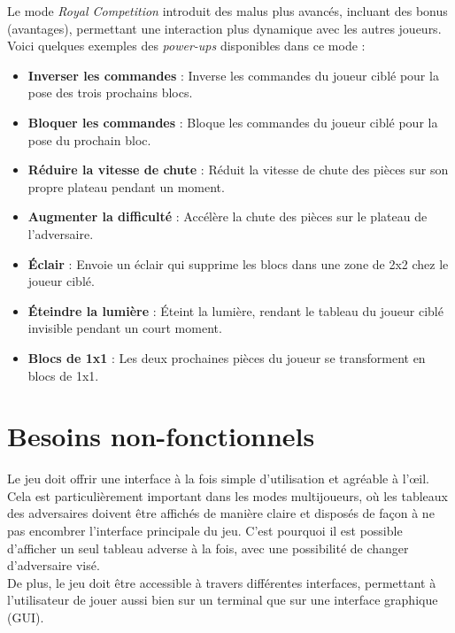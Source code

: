 \documentclass{report}
\begin{document}
\vspace{-1em}

\noindent Le mode \emph{Royal Competition} introduit des malus plus avancés, incluant des bonus (avantages), permettant une interaction plus dynamique avec les autres joueurs. Voici quelques exemples des \textit{power-ups} disponibles dans ce mode :
\begin{itemize}
    \item \textbf{Inverser les commandes} : Inverse les commandes du joueur ciblé pour la pose des trois prochains blocs.
    \item \textbf{Bloquer les commandes} : Bloque les commandes du joueur ciblé pour la pose du prochain bloc.
    \item \textbf{Réduire la vitesse de chute} : Réduit la vitesse de chute des pièces sur son propre plateau pendant un moment.
    \item \textbf{Augmenter la difficulté} : Accélère la chute des pièces sur le plateau de l’adversaire.
    \item \textbf{Éclair} : Envoie un éclair qui supprime les blocs dans une zone de 2x2 chez le joueur ciblé.
    \item \textbf{Éteindre la lumière} : Éteint la lumière, rendant le tableau du joueur ciblé invisible pendant un court moment.
    \item \textbf{Blocs de 1x1} : Les deux prochaines pièces du joueur se transforment en blocs de 1x1.
\end{itemize}





\section{Besoins non-fonctionnels}

\noindent Le jeu doit offrir une interface à la fois simple d’utilisation et agréable à l’œil. Cela est particulièrement important dans les modes multijoueurs, où les tableaux des adversaires doivent être affichés de manière claire et disposés de façon à ne pas encombrer l’interface principale du jeu. C'est pourquoi il est possible d'afficher un seul tableau adverse à la fois, avec une possibilité de changer d'adversaire visé.\\ 

\noindent De plus, le jeu doit être accessible à travers différentes interfaces, permettant à l’utilisateur de jouer aussi bien sur un terminal que sur une interface graphique (GUI). \\
\end{document}
